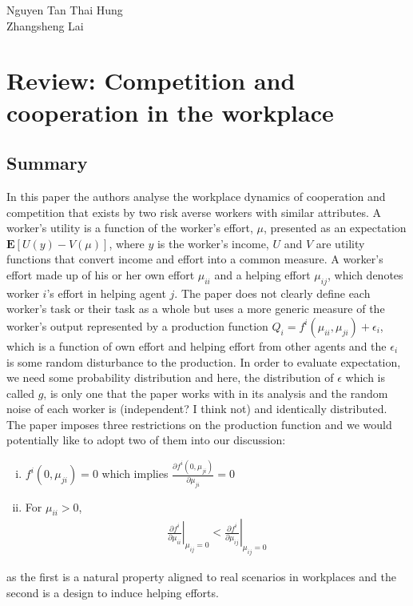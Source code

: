 \documentclass[a4paper,10pt,leqno]{article}
\theoremstyle{definition}
\begin{document}
\begin{flushright}
Nguyen Tan Thai Hung\\
Zhangsheng Lai\\
\end{flushright}
\section*{Review: Competition and cooperation in the
workplace}
\subsection*{Summary}

In this paper the authors analyse the workplace dynamics of cooperation and competition that exists by two risk averse workers with similar attributes. A worker's utility is a function of the worker's effort, $\mu$, presented as an expectation $\mathbf{E}[U(y)-V(\mu)]$,
where $y$ is the worker's income, $U$ and $V$ are utility functions that convert income and effort into a common measure. A worker's effort made up of his or her own effort $\mu_{ii}$ and a helping effort $\mu_{ij}$, which denotes worker $i$'s effort in helping agent $j$. The paper does not clearly define each worker's task or their task as a whole but uses a more generic measure of the worker's output represented by a production function $Q_i=f^i(\mu_{ii},\mu_{ji})+\epsilon_i$,
which is a function of own effort and helping effort from other agents and the $\epsilon_i$ is some random disturbance to the production. In order to evaluate expectation, we need some probability distribution and here, the distribution of $\epsilon$ which is called $g$, is only one that the paper works with in its analysis and the random noise of each worker is (independent? I think not) and identically distributed. The paper imposes three restrictions on the production function and we would potentially like to adopt two of them into our discussion: 
\begin{enumerate}[(i)]
\item $f^i(0,\mu_{ji})=0$ which implies $\frac{\partial f^i(0,\mu_{ji})}{\partial \mu_{ji}}=0$
\item For $\mu_{ii}>0$,
\begin{align*}
\left.\frac{\partial f^i}{\partial \mu_{ii}}\right|_{\mu_{ij}=0} < \left.\frac{\partial f^i}{\partial \mu_{ij}}\right|_{\mu_{ij}=0}
\end{align*}
\end{enumerate}
as the first is a natural property aligned to real scenarios in workplaces and the second is a design to induce helping efforts. 
\end{document}
